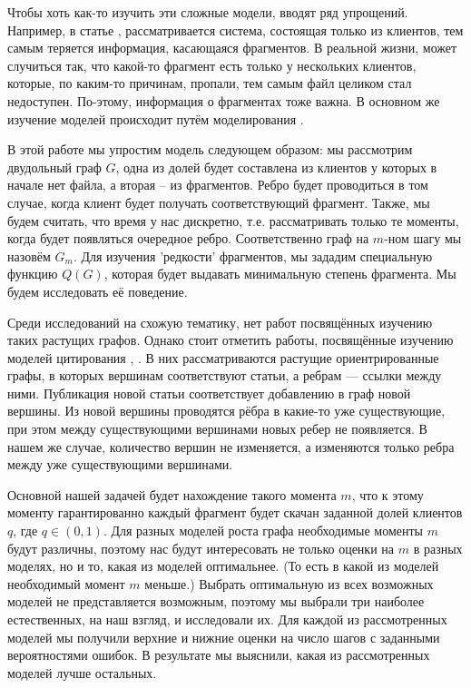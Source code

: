 \documentclass{matmex-diploma-custom}
\theoremstyle{named}
\begin{document}
Чтобы хоть как-то изучить эти сложные модели, вводят ряд упрощений.
Например, в статье \cite{cool}, рассматривается система, состоящая только из клиентов, тем самым теряется информация, касающаяся фрагментов.
В реальной жизни, может случиться так, что какой-то фрагмент есть только у нескольких клиентов, которые, 
по каким-то причинам, пропали, тем самым файл целиком стал недоступен.
По-этому, информация о фрагментах тоже важна. 
В основном же изучение моделей происходит путём моделирования \cite{unavalib}.


В этой работе мы упростим модель следующем образом: мы рассмотрим двудольный граф $G$, 
одна из долей будет составлена из клиентов у которых в начале нет файла,
а вторая -- из фрагментов. Ребро будет проводиться в том случае, когда клиент будет получать соответствующий фрагмент.
Также, мы будем считать, что время у нас дискретно, т.е. рассматривать только те моменты, когда будет появляться очередное ребро.
Соответственно граф на $m$-ном шагу мы назовём $G_m$.
Для изучения 'редкости' фрагментов, мы зададим специальную функцию $Q(G)$, которая будет выдавать минимальную степень фрагмента.
Мы будем исследовать её поведение.

Среди исследований на схожую тематику, нет работ посвящённых изучению таких растущих графов.
Однако стоит отметить работы, посвящённые изучению моделей цитирования \cite{price}, \cite{newman}. 
В них рассматриваются растущие ориентрированные графы, в которых вершинам соответствуют статьи, а ребрам --- ссылки между ними. 
Публикация новой статьи соответствует добавлению в граф новой вершины.
Из новой вершины проводятся рёбра в какие-то уже существующие, при этом между существующими вершинами новых ребер не появляется.
В нашем же случае, количество вершин не изменяется, а изменяются только ребра между уже существующими вершинами.

Основной нашей задачей будет нахождение такого момента $m$, что к этому моменту гарантированно каждый фрагмент будет скачан 
заданной долей клиентов $q$, где $q \in (0, 1)$. Для разных моделей роста графа необходимые моменты $m$ будут различны, поэтому 
нас будут интересовать не только оценки на $m$ в разных моделях, но и то, какая из моделей оптимальнее. (То есть в какой из моделей 
необходимый момент $m$ меньше.) Выбрать оптимальную из всех возможных моделей не представляется возможным, поэтому мы выбрали три 
наиболее естественных, на наш взгляд, и исследовали их. Для каждой из рассмотренных моделей мы получили верхние и нижние оценки 
на число шагов с заданными вероятностями ошибок. В результате мы выяснили, какая из рассмотренных моделей лучше остальных.
\end{document}
